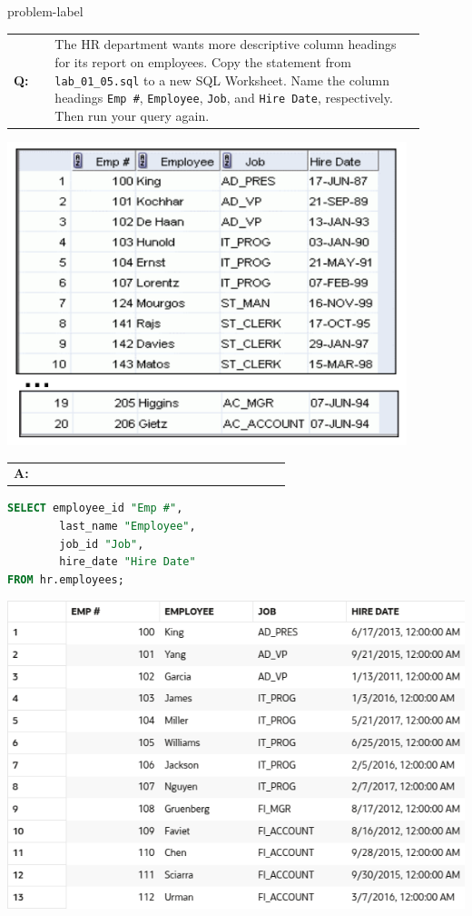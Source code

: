 \begin{problem}{}{problem-label}

\begin{tabular}{@{}l p{0.9\linewidth}@{}}
  \textbf{Q:} & The HR department wants more descriptive column headings for its report on employees. Copy the statement from \texttt{lab\_01\_05.sql} to a new SQL Worksheet. Name the column headings
\texttt{Emp \#}, \texttt{Employee}, \texttt{Job}, and \texttt{Hire Date}, respectively. Then run your query again.
\end{tabular}

\begin{center}
  \includegraphics[scale=0.7]{images/c1q8.png}
\end{center}

\begin{tabular}{@{}l p{0.9\linewidth}@{}}
  \textbf{A:} &
\end{tabular}

\begin{lstlisting}[language=SQL]
SELECT employee_id "Emp #", 
        last_name "Employee", 
        job_id "Job", 
        hire_date "Hire Date"
FROM hr.employees;
\end{lstlisting}

\vspace{1em}

\begin{center}
  \includegraphics[scale=0.5]{images/c1a10.png}
\end{center}

\end{problem}


